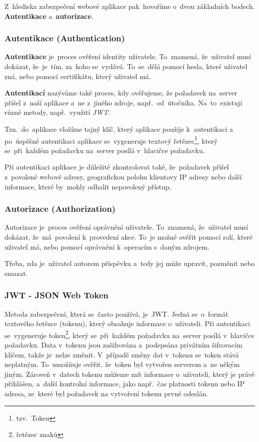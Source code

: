 \documentclass[14pt]{article}
\begin{document}
        Z~hlediska zabezpečení webové aplikace pak~hovoříme o~dvou základních bodech. \textbf{Autentikace} a~\textbf{autorizace}.

            \subsubsection{Autentikace (Authentication)}
            \textbf{Autentikace} je~proces ověření identity uživatele. To~znamená, že~uživatel musí dokázat, že~je~tím, za~koho se~vydává.
            To~se~dělá pomocí hesla, které uživatel zná, nebo pomocí certifikátu, který uživatel má.

            \textbf{Autentikací} nazýváme také proces, kdy ověřujeme, že požadavek na~server přišel z~naší aplikace a~ne z~jiného zdroje,
            např.~od~útočníka. Na~to~existují různé metody, např.~využití \emph{JWT}.

            Tzn.~do~aplikace vložíme tajný klíč, který aplikace použije k~autentikaci a po~úspěšné autentikaci aplikace se~vygeneruje textový řetězec\footnote{tzv.~Token},
            který se~při~každém požadavku na~server posílá v~hlavičce požadavku.

            Při autentikaci aplikace je důležité zkontrolovat také, že~požadavek přišel z~povolené webové adresy, geografickou polohu klientovy IP adresy
            nebo další informace, které by~mohly odhalit nepovolený přístup. \parencite{graham2021ethical}

            \subsubsection{Autorizace (Authorization)}
            Autorizace je~proces ověření oprávnění uživatele. To~znamená, že~uživatel musí dokázat, že~má~povolení k~provedení akce.
            To~je možné ověřit pomocí rolí, které uživatel má, nebo pomocí oprávnění k~operacím s~daným zdrojem.

            Třeba, zda je~uživatel autorem příspěvku a~tedy jej může upravit, pozměnit nebo smazat.\parencite{graham2021ethical}

            \subsubsection{JWT - JSON Web Token}
            Metoda zabezpečení, která se~často používá, je~JWT. Jedná se~o~formát textového řetězce (tokenu), který obsahuje informace o~uživateli.
            Při autentikaci se~vygeneruje token\footnote{řetězec znaků}, který se~při~každém požadavku na~server posílá v~hlavičce požadavku.
            Data v~tokenu jsou zašifrována a~podepsána privátním šifrovacím klíčem, takže je~nelze změnit. V~případě změny dat v~tokenu se~token stává neplatným.
            To~umožňuje ověřit, že~token byl vytvořen serverem a~ne někým jiným. Zároveň v~datech tokenu můžeme mít informace o~uživateli, který je právě přihlášen,
            a~další kontrolní informace, jako např.~čas platnosti tokenu nebo IP adresa, ze~které byl požadavek na vytvoření tokenu prvně odeslán.
\end{document}
